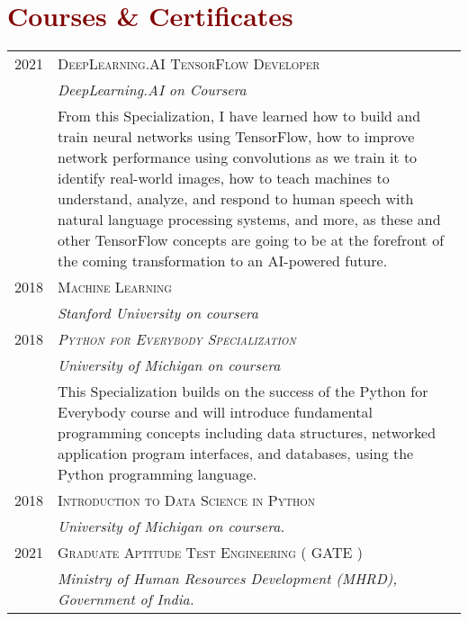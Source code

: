 \documentclass[a4paper,11pt]{article}
\begin{document}
\section{\textcolor{Maroon}{Courses \& Certificates}}
\vspace{3mm}
\begin{tabular}{r|p{16cm}}

\textsc{2021} & {\normalsize{ \textsc{DeepLearning.AI TensorFlow Developer}}}\\ & \emph{{\normalsize{DeepLearning.AI on Coursera}}} \\ & {\small{ From this Specialization, I have
learned how to build and train neural networks using TensorFlow,
how to improve network performance using convolutions as we train
it to identify real-world images, how to teach machines to understand,
analyze, and respond to human speech with natural language
processing systems, and more, as these and other TensorFlow
concepts are going to be at the forefront of the coming
transformation to an AI-powered future.
 }}\vspace{3mm}\\
 
 \textsc{2018} & {\normalsize{ \textsc{Machine Learning}}}\\ & \emph{{\small{Stanford University on coursera}}}\vspace{3mm}\\

\textsc{2018 } & \emph{{\normalsize{\textsc{Python for Everybody Specialization}}}}\\ & {  \emph{University of Michigan on coursera} }\\ & \small{ This Specialization builds on the success of the Python for
Everybody course and will introduce fundamental programming
concepts including data structures, networked application
program interfaces, and databases, using the Python
programming language.}\vspace{3mm}\\
\textsc{2018} & {\normalsize{ \textsc{Introduction to Data Science in Python}}}\\ & \emph{{\small{University of Michigan on coursera.}}}\vspace{3mm}\\

  \textsc{2021} & {\normalsize{ \textsc{Graduate Aptitude Test
Engineering}} {( GATE )}}\\ & \emph{Ministry of Human Resources
Development (MHRD), Government of India.}
\vspace{3mm}\\

\end{tabular}
\end{document}
